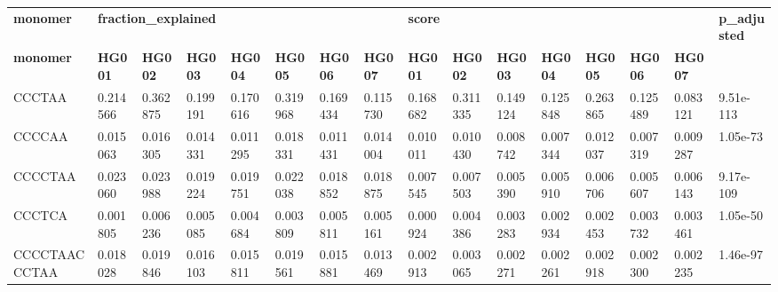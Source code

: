 \begin{samepage} \begin{table}[h!] \small \begin{tabular}{llllllllllllllll}
\hline
\textbf{monomer}  &  \multicolumn{7}{l}{\textbf{fraction\_explained}}  &  \multicolumn{7}{l}{\textbf{score}}  &  \textbf{p\_adjusted} \\
\textbf{monomer}  &  \textbf{HG001}                                    &  \textbf{HG002}                      &  \textbf{HG003}           &  \textbf{HG004}  &  \textbf{HG005}  &  \textbf{HG006}  &  \textbf{HG007}  &  \textbf{HG001}  &  \textbf{HG002}  &  \textbf{HG003}  &  \textbf{HG004}  &  \textbf{HG005}  &  \textbf{HG006}  &  \textbf{HG007}  &  \textbf{} \\
\hline
CCCTAA            &  0.214566                                          &  0.362875                            &  0.199191                 &  0.170616        &  0.319968        &  0.169434        &  0.115730        &  0.168682        &  0.311335        &  0.149124        &  0.125848        &  0.263865        &  0.125489        &  0.083121        &  9.51e-113 \\
CCCCAA            &  0.015063                                          &  0.016305                            &  0.014331                 &  0.011295        &  0.018331        &  0.011431        &  0.014004        &  0.010011        &  0.010430        &  0.008742        &  0.007344        &  0.012037        &  0.007319        &  0.009287        &  1.05e-73 \\
CCCCTAA           &  0.023060                                          &  0.023988                            &  0.019224                 &  0.019751        &  0.022038        &  0.018852        &  0.018875        &  0.007545        &  0.007503        &  0.005390        &  0.005910        &  0.006706        &  0.005607        &  0.006143        &  9.17e-109 \\
CCCTCA            &  0.001805                                          &  0.006236                            &  0.005085                 &  0.004684        &  0.003809        &  0.005811        &  0.005161        &  0.000924        &  0.004386        &  0.003283        &  0.002934        &  0.002453        &  0.003732        &  0.003461        &  1.05e-50 \\
CCCCTAACCCTAA     &  0.018028                                          &  0.019846                            &  0.016103                 &  0.015811        &  0.019561        &  0.015881        &  0.013469        &  0.002913        &  0.003065        &  0.002271        &  0.002261        &  0.002918        &  0.002300        &  0.002235        &  1.46e-97 \\

\end{tabular}
\end{table}
\end{samepage}
